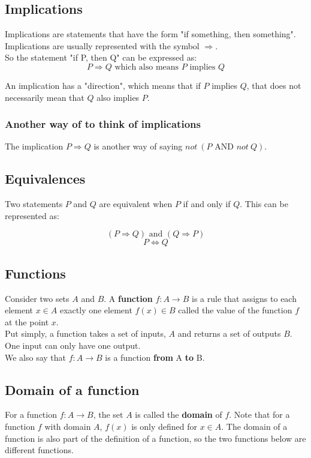 \documentclass[11pt]{article}
\begin{document}
\subsection{Implications}
\label{sec:org56007ac}
Implications are statements that have the form "if something, then something". Implications are usually represented with the symbol \(\Rightarrow\).
\\[0pt]

So the statement "if P, then Q" can be expressed as:
\[P \Rightarrow Q \text{ which also means } P \text{ implies } Q\]

An implication has a "direction", which means that if \(P\) implies \(Q\), that does not necessarily mean that \(Q\) also implies \(P\).

\subsubsection{Another way of to think of implications}
\label{sec:org79fa0de}
The implication \(P \Rightarrow Q\) is another way of saying \(not \ (P \text{ AND } not \ Q)\).

\subsection{Equivalences}
\label{sec:org44d4c37}
Two statements \(P\) and \(Q\) are equivalent when \(P\) if and only if \(Q\). This can be represented as:

\[(P \Rightarrow Q) \text{ and } (Q \Rightarrow P)\]
\[P \Leftrightarrow Q\]

\subsection{Functions}
\label{sec:org8390247}
Consider two sets \(A\) and \(B\). A \textbf{function} \(f : A \rightarrow B\) is a rule that assigns to each element \(x \in A\) exactly one element \(f(x) \in B\) called the value of the function \(f\) at the point \(x\).
\\[0pt]

Put simply, a function takes a set of inputs, \(A\) and returns a set of outputs \(B\). One input can only have one output.
\\[0pt]

We also say that \(f : A \rightarrow B\) is a function \textbf{from} A \textbf{to} B.

\subsection{Domain of a function}
\label{sec:org0f3cb93}
For a function \(f : A \rightarrow B\), the set \(A\) is called the \textbf{domain} of \(f\). Note that for a function \(f\) with domain \(A\), \(f(x)\) is only defined for \(x \in A\). The domain of a function is also part of the definition of a function, so the two functions below are different functions.
\end{document}
